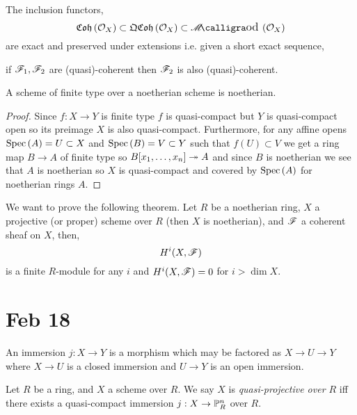 \documentclass[12pt]{article}
\begin{document}
\begin{remark}
The inclusion functors,
\[ \Coh{\struct{X}} \subset \QCoh{\struct{X}} \subset \shMod{\struct{X}} \]
are exact and preserved under extensions i.e. given a short exact sequence,
\begin{center}
\end{center}
if $\F_1, \F_2$ are (quasi)-coherent  then $\F_2$ is also (quasi)-coherent. 
\end{remark}

\begin{lemma}
A scheme of finite type over a noetherian scheme is noetherian.
\end{lemma}

\begin{proof}
Since $f : X \to Y$ is finite type $f$ is quasi-compact but $Y$ is quasi-compact open so its preimage $X$ is also quasi-compact. Furthermore, for any affine opens $\Spec{A} = U \subset X$ and $\Spec{B} = V \subset Y$ such that $f(U) \subset V$ we get a ring map $B \to A$ of finite type so $B[x_1, \dots, x_n] \onto A$ and since $B$ is noetherian we see that $A$ is noetherian so $X$ is quasi-compact and covered by $\Spec{A}$ for noetherian rings $A$. 
\end{proof}

\begin{remark}
We want to prove the following theorem. Let $R$ be a noetherian ring, $X$ a projective (or proper) scheme over $R$ (then $X$ is noetherian), and $\F$ a coherent sheaf on $X$, then,
\[ H^i(X, \F) \]
is a finite $R$-module for any $i$ and $H^i(X, \F) = 0$ for $i > \dim{X}$. 
\end{remark}

\section{Feb 18}

\begin{definition}
An immersion $j : X \to Y$ is a morphism which may be factored as $X \to U \to Y$ where $X \to U$ is a closed immersion and $U \to Y$ is an open immersion.
\end{definition}

\begin{definition}
Let $R$ be a ring, and $X$ a scheme over $R$. We say $X$ is \textit{quasi-projective over $R$} iff there exists a quasi-compact immersion $j : X \to \P^n_R$ over $R$.
\end{definition}
\end{document}
